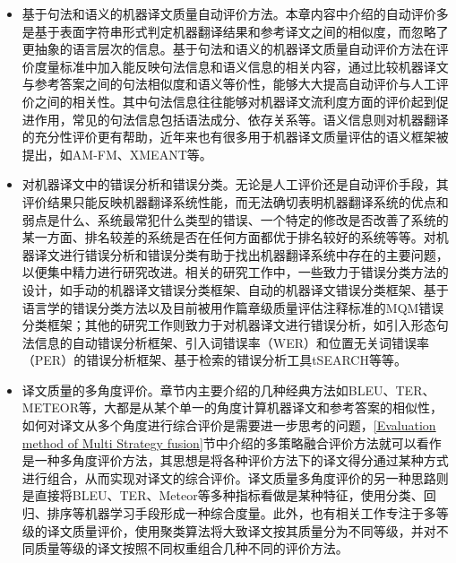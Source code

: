 \begin{itemize}
\vspace{0.5em}
\item 基于句法和语义的机器译文质量自动评价方法。本章内容中介绍的自动评价多是基于表面字符串形式判定机器翻译结果和参考译文之间的相似度，而忽略了更抽象的语言层次的信息。基于句法和语义的机器译文质量自动评价方法在评价度量标准中加入能反映句法信息和语义信息的相关内容，通过比较机器译文与参考答案之间的句法相似度和语义等价性，能够大大提高自动评价与人工评价之间的相关性。其中句法信息往往能够对机器译文流利度方面的评价起到促进作用，常见的句法信息包括语法成分、依存关系等。语义信息则对机器翻译的充分性评价更有帮助，近年来也有很多用于机器译文质量评估的语义框架被提出，如AM-FM、XMEANT等。
\vspace{0.5em}
\item 对机器译文中的错误分析和错误分类。无论是人工评价还是自动评价手段，其评价结果只能反映机器翻译系统性能，而无法确切表明机器翻译系统的优点和弱点是什么、系统最常犯什么类型的错误、一个特定的修改是否改善了系统的某一方面、排名较差的系统是否在任何方面都优于排名较好的系统等等。对机器译文进行错误分析和错误分类有助于找出机器翻译系统中存在的主要问题，以便集中精力进行研究改进。相关的研究工作中，一些致力于错误分类方法的设计，如手动的机器译文错误分类框架、自动的机器译文错误分类框架、基于语言学的错误分类方法以及目前被用作篇章级质量评估注释标准的MQM错误分类框架；其他的研究工作则致力于对机器译文进行错误分析，如引入形态句法信息的自动错误分析框架、引入词错误率（WER）和位置无关词错误率（PER）的错误分析框架、基于检索的错误分析工具tSEARCH等等。
\vspace{0.5em}
\item 译文质量的多角度评价。章节内主要介绍的几种经典方法如BLEU、TER、METEOR等，大都是从某个单一的角度计算机器译文和参考答案的相似性，如何对译文从多个角度进行综合评价是需要进一步思考的问题，\ref{Evaluation method of Multi Strategy fusion}节中介绍的多策略融合评价方法就可以看作是一种多角度评价方法，其思想是将各种评价方法下的译文得分通过某种方式进行组合，从而实现对译文的综合评价。译文质量多角度评价的另一种思路则是直接将BLEU、TER、Meteor等多种指标看做是某种特征，使用分类、回归、排序等机器学习手段形成一种综合度量。此外，也有相关工作专注于多等级的译文质量评价，使用聚类算法将大致译文按其质量分为不同等级，并对不同质量等级的译文按照不同权重组合几种不同的评价方法。

\end{itemize}
